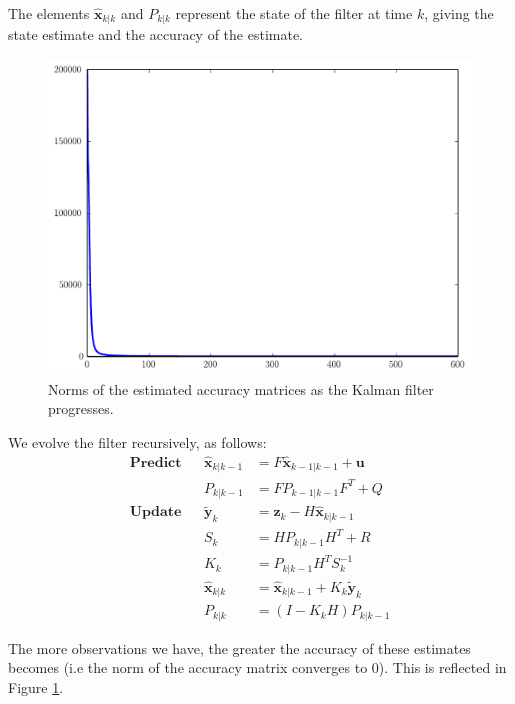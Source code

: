 The elements $\widehat{\mathbf{x}}_{k|k}$ and $P_{k|k}$ represent the state of the filter at time $k$, giving the state estimate and the accuracy of the estimate.

\begin{figure}
	\centering
	\includegraphics[width=.90\textwidth]{norms} 
	\caption{Norms of the estimated accuracy matrices as the Kalman filter progresses. }
	\label{fig:norms}
\end{figure}

We evolve the filter recursively, as follows:
\begin{align*}
\textbf{Predict} & & \widehat{\mathbf{x}}_{k|k-1} & = F\widehat{\mathbf{x}}_{k-1|k-1} + \mathbf{u} \\
 & & P_{k|k-1} & = FP_{k-1|k-1}F^{T} + Q \\
\textbf{Update} & & \tilde{\mathbf{y}}_{k} & = \mathbf{z}_{k} - H\widehat{\mathbf{x}}_{k|k-1} \\
 & & S_{k} & = HP_{k|k-1}H^{T} + R \\
 & & K_{k} & = P_{k|k-1}H^{T}S_{k}^{-1} \\
 & & \widehat{\mathbf{x}}_{k|k} & = \widehat{\mathbf{x}}_{k|k-1} + K_{k}\tilde{\mathbf{y}}_{k} \\
 & & P_{k|k} & = (I - K_{k}H)P_{k|k-1}
\end{align*}

The more observations we have, the greater the accuracy of these estimates becomes (i.e the norm of the accuracy matrix converges to $0$).
This is reflected in Figure \ref{fig:norms}.

